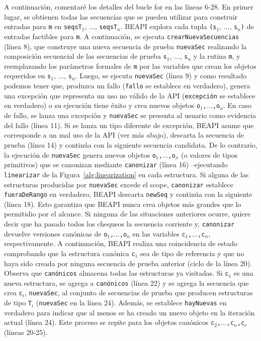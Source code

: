 A continuación, comentaré los detalles del bucle for en las líneas 6-28. 
En primer lugar, se obtienen todas las secuencias que se pueden utilizar para construir entradas para \texttt{m} en \texttt{seqsT$_1$}, ..., \texttt{seqsT$_n$}. \textsf{BEAPI} explora cada tupla \texttt{(s$_1$}, ..., \texttt{s$_n$)} de entradas factibles para \texttt{m}.
A continuación, se ejecuta \texttt{crearNuevaSecuencias} (línea 8), que construye una nueva secuencia de prueba \texttt{nuevaSec} realizando la composición secuencial de las secuencias de prueba \texttt{s$_1$}, ..., \texttt{s$_n$} y la rutina \texttt{m}, 
y reemplazando los parámetros formales de \texttt{m} por las variables que crean los objetos requeridos en \texttt{s$_1$}, ..., \texttt{s$_n$}. 
Luego, se ejecuta \texttt{nuevaSec} (línea 9) y como resultado podemos tener que, produzca un fallo (\texttt{fallo} se establece en verdadero), genera una excepción que representa un uso no válido de la API (\texttt{excepci\'on} se establece en verdadero) 
o su ejecución tiene éxito y crea nuevos objetos \texttt{o$_1$,$\ldots$,o$_n$}. 
En caso de fallo, se lanza una excepción y \texttt{nuevaSec} se presenta al usuario como evidencia del fallo (línea 11). 
Si se lanza un tipo diferente de excepción, \textsf{BEAPI} asume que corresponde a un mal uso de la API (ver más abajo), descarta la secuencia de prueba (línea 14) y continúa con la siguiente secuencia candidata. 
De lo contrario, la ejecución de \texttt{nuevaSec} genera nuevos objetos \texttt{o$_1$,$\ldots$,o$_n$} (o valores de tipos primitivos) 
que se canonizan mediante \texttt{canonizar} (línea 16) --ejecutando \texttt{linearizar} de la Figura~\ref{alg:linearization} en cada estructura. 
Si alguna de las estructuras producidas por \texttt{nuevaSec} excede el scope, \texttt{canonizar} establece \texttt{fueraDeRango} en verdadero, \textsf{BEAPI} descarta \texttt{newSeq} 
y continúa con la siguiente (línea 18).
Esto garantiza que \textsf{BEAPI} nunca crea objetos más grandes que lo permitidio por el alcance.
Si ninguna de las situaciones anteriores ocurre, quiere decir que ha pasado todos los chequeos la secuencia corriente y, 
\texttt{canonizar} devuelve versiones canónicas de \texttt{o$_1$,$\ldots$,o$_n$} en las variables \texttt{c$_1$,$\ldots$,c$_n$}, respectivamente. 
A continuación, \textsf{BEAPI} realiza una coincidencia de estado comprobando que la estructura canónica \texttt{c$_1$} sea de tipo de referencia 
y que no haya sido creada por ninguna secuencia de prueba anterior (ciclo de la línea 20). 
Observa que \texttt{canónicos} almacena todas las estructuras ya visitadas. 
Si \texttt{c$_1$} es una nueva estructura, se agrega a \texttt{canónicos} (línea 22) y se agrega la secuencia que crea \texttt{c$_i$}, 
\texttt{nuevaSec}, al conjunto de secuencias de prueba que producen estructuras de tipo \texttt{T$_i$} (\texttt{nuevaSec} en la línea 24).
Además, se establece \texttt{hayNuevas} en verdadero para indicar que al menos se ha creado un nuevo objeto en la iteración actual (línea 24). 
Este proceso se repite para los objetos canónicos \texttt{c$_2$,$\ldots$,c$_n$,c$_r$} (líneas 20-25).


